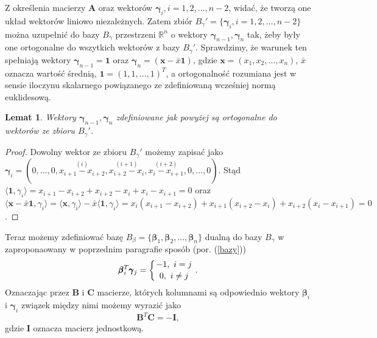 \documentclass[12pt]{mwart}
\newtheorem{lm}{Lemat}
\begin{document}
Z określenia macierzy $\mathbf{A}$ oraz wektorów $\pmb{\gamma}_i, i=1,2,\dots,n-2$, widać, że tworzą one układ wektorów liniowo niezależnych. Zatem zbiór $B_{\gamma}'=\{\pmb{\gamma}_i,i=1,2,\dots, n-2\}$ można uzupełnić do bazy $B_{\gamma}$ przestrzeni $\mathbb{R}^n$ o wektory $\pmb{\gamma}_{n-1},\pmb{\gamma}_n$ tak, żeby były one ortogonalne do wszytkich wektorów z bazy $B_{\gamma}'$. Sprawdzimy, że warunek ten spełniają wektory $\pmb{\gamma}_{n-1}=\textbf{1}$ oraz $\pmb{\gamma}_n=(\pmb{x}-\bar{x}\textbf{1})$, gdzie $\pmb{x}=(x_1,x_2,\dots,x_n)$, $\bar{x}$ oznacza wartość średnią, $\textbf{1}=(1,1,\dots,1)^T$, a ortogonalność rozumiana jest w sensie iloczynu skalarnego powiązanego ze zdefiniowaną wcześniej normą euklidesową.
\begin{lm}\label{ortogonalnosc}
Wektory $\pmb{\gamma}_{n-1},\pmb{\gamma}_n$ zdefiniowane jak powyżej są ortogonalne do wektorów ze zbioru $B_{\gamma}'$.
\end{lm}
\begin{proof}
Dowolny wektor ze zbioru $B_{\gamma}'$ możemy zapisać jako\\ $\pmb{\gamma}_i=(0,\dots,0,\overset{(i)} {x_{i+1}-x_{i+2}},\overset{(i+1)}{x_{i+2}-x_i},\overset{(i+2)}{x_i-x_{i+1}},0,\dots,0)$. Stąd $\langle \pmb{1},\gamma_i\rangle= x_{i+1}-x_{i+2}+x_{i+2}-x_i+x_i-x_{i+1}=0$ oraz $\langle \pmb{x}-\bar{x}\pmb{1},\gamma_i\rangle = \langle \pmb{x},\gamma_i\rangle -\bar{x}\langle \pmb{1},\gamma_i\rangle=x_i(x_{i+1}-x_{i+2})+x_{i+1}(x_{i+2}-x_i)+x_{i+2}(x_i-x_{i+1})=0$.
\end{proof}
Teraz możemy zdefiniować bazę $B_{\beta}=\{\pmb{\beta}_1,\pmb{\beta}_2,\dots,\pmb{\beta}_n\}$ dualną do bazy $B_{\gamma}$ w zaproponaowany w poprzednim paragrafie sposób (por. (\ref{bazy}))
\begin{displaymath}
\pmb{\beta}_i^T\pmb{\gamma}_j=\left\{{-1,\ i=j}\atop {0,\ i\neq j}\right. .
\end{displaymath}
Oznaczając przez $\mathbf{B}$ i $\mathbf{C}$ macierze, których kolumnami są odpowiednio wektory $\pmb{\beta}_i$ i $\pmb{\gamma}_i$ związek między nimi możemy wyrazić jako 
\begin{displaymath}
\mathbf{B}^T\mathbf{C}=-\mathbf{I},
\end{displaymath}
gdzie $\mathbf{I}$ oznacza macierz jednostkową. 
\end{document}
